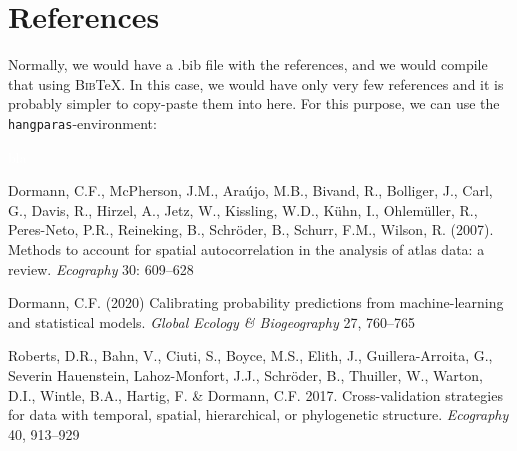 \documentclass[a4paper, 11pt]{article}\usepackage[]{graphicx}\usepackage[]{color}
\begin{document}
\section{References}
Normally, we would have a .bib file with the references, and we would compile that using \textsc{Bib}\negthinspace\TeX. In this case, we would have only very few references and it is probably simpler to copy-paste them into here. For this purpose, we can use the \texttt{hangparas}-environment:

\begin{hangparas}{.25in}{1}
\textcolor{white}{bla} \vspace{-15pt} %

Dormann, C.F., McPherson, J.M., Araújo, M.B., Bivand, R., Bolliger, J., Carl, G., Davis, R., Hirzel, A., Jetz, W., Kissling, W.D., Kühn, I., Ohlemüller, R., Peres-Neto, P.R., Reineking, B., Schröder, B., Schurr, F.M., Wilson, R. (2007). Methods to account for spatial autocorrelation in the analysis of atlas data: a review. \emph{Ecography} 30: 609--628

Dormann, C.F. (2020) Calibrating probability predictions from machine-learning and statistical models. \emph{Global Ecology \& Biogeography} 27, 760--765

Roberts, D.R., Bahn, V., Ciuti, S., Boyce, M.S., Elith, J., Guillera-Arroita, G., Severin Hauenstein, Lahoz-Monfort, J.J., Schröder, B., Thuiller, W., Warton, D.I., Wintle, B.A., Hartig, F. \& Dormann, C.F. 2017. Cross-validation strategies for data with temporal, spatial, hierarchical, or phylogenetic structure. \emph{Ecography} 40, 913--929
\end{hangparas}
\end{document}
